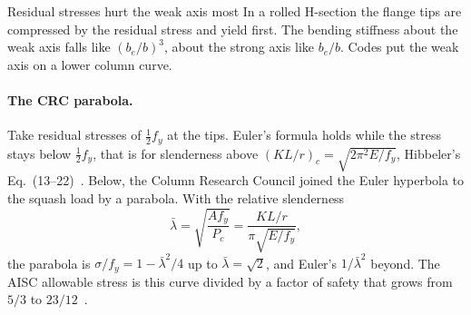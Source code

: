 \begin{gbox}{Residual stresses hurt the weak axis most}\label{sec:tw-weakaxis}
%
In a rolled H-section the flange tips are compressed by the residual stress and yield first. The bending
stiffness about the weak axis falls like $(b_e/b)^3$, about the strong axis like $b_e/b$. Codes put the
weak axis on a lower column curve.
\end{gbox}

\paragraph{The CRC parabola.}
%
Take residual stresses of $\tfrac12f_y$ at the tips. Euler's formula holds while the stress stays below
$\tfrac12f_y$, that is for slenderness above $(KL/r)_c = \sqrt{2\pi^2E/f_y}$, Hibbeler's
Eq.~(13--22)~\cite{tw-hibbeler2014}. Below, the Column Research Council joined the Euler hyperbola to the
squash load by a parabola. With the relative slenderness
\begin{equation}\label{eq:tw-lambdabar}
  \bar\lambda = \sqrt{\frac{Af_y}{P_c}} = \frac{KL/r}{\pi\sqrt{E/f_y}} ,
\end{equation}
the parabola is $\sigma/f_y = 1 - \bar\lambda^2/4$ up to $\bar\lambda = \sqrt2$, and Euler's $1/\bar\lambda^2$ beyond. The
AISC allowable stress is this curve divided by a factor of safety that grows from $5/3$ to
$23/12$~\cite[Eqs.~(13--21)--(13--23)]{tw-hibbeler2014}.

